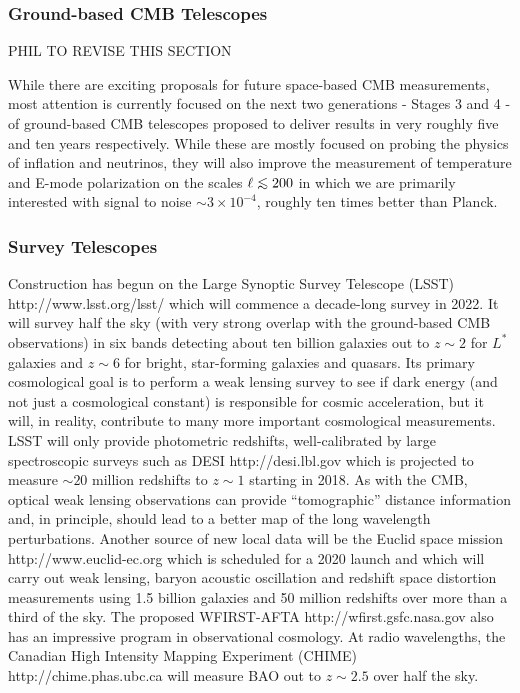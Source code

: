 \documentclass[psfig,11pt]{article}
\def\lo{\mathrel{\raise.3ex\hbox{$<$}\mkern-14mu\lower0.6ex\hbox{$\sim$}}}
\begin{document}
\subsubsection{Ground-based CMB Telescopes}

PHIL TO REVISE THIS SECTION

While there are exciting proposals for future space-based CMB measurements, most attention is currently focused on the next two generations - Stages 3 and 4 - of ground-based CMB telescopes proposed to deliver results in very roughly five and ten years respectively. While these are mostly focused on probing the physics of inflation and neutrinos, they will also improve the measurement of temperature and E-mode polarization on the scales $\ell\lo200$ in which we are primarily interested with signal to noise $\sim3\times10^{-4}$, roughly ten times better than Planck.

\subsubsection{Survey Telescopes}

Construction has begun on the Large Synoptic Survey Telescope (LSST) http://www.lsst.org/lsst/ which will commence a decade-long survey in 2022. It will survey half the sky (with very strong overlap with the ground-based CMB observations) in six bands detecting about ten billion galaxies out to $z\sim2$ for $L^\ast$ galaxies and $z\sim6$ for bright, star-forming galaxies and quasars. Its primary cosmological goal is to perform a weak lensing survey to see if dark energy (and not just a cosmological constant) is responsible for cosmic acceleration, but it will, in reality, contribute to many more important cosmological measurements. LSST will only provide photometric redshifts, well-calibrated by large spectroscopic surveys such as DESI http://desi.lbl.gov which is projected to measure $\sim20$ million redshifts to $z\sim1$ starting in 2018. As with the CMB, optical weak lensing observations can provide ``tomographic'' distance information and, in principle, should lead to a better map of the long wavelength perturbations. Another source of new local data will be the Euclid space mission http://www.euclid-ec.org which is scheduled for a 2020 launch and which will carry out weak lensing, baryon acoustic oscillation and redshift space distortion measurements using 1.5 billion galaxies and 50 million redshifts over more than a third of the sky. The proposed WFIRST-AFTA http://wfirst.gsfc.nasa.gov also has an impressive program in observational cosmology. At radio wavelengths, the Canadian High Intensity Mapping Experiment (CHIME) http://chime.phas.ubc.ca will measure BAO out to $z\sim2.5$ over half the sky.
\end{document}
